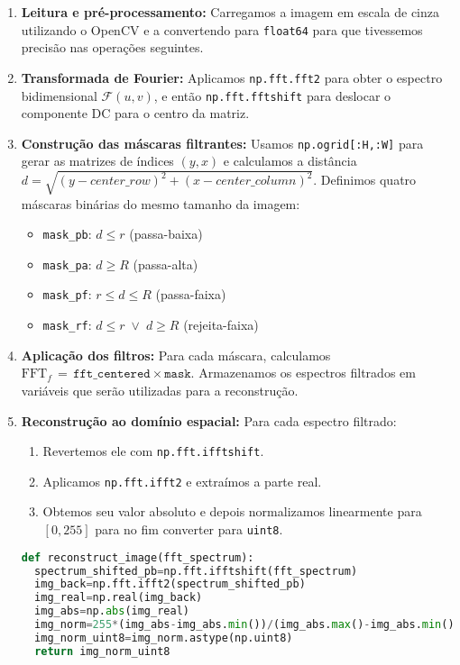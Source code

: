 \documentclass[12pt,a4paper]{article}
\begin{document}
\begin{enumerate}
  \item \textbf{Leitura e pré-processamento:}  
    Carregamos a imagem em escala de cinza utilizando o OpenCV e a convertendo para \texttt{float64} para que tivessemos precisão nas operações seguintes.

  \item \textbf{Transformada de Fourier:}  
    Aplicamos \texttt{np.fft.fft2} para obter o espectro bidimensional \(\mathcal{F}(u,v)\), e então \texttt{np.fft.fftshift} para deslocar o componente DC para o centro da matriz.

  \item \textbf{Construção das máscaras filtrantes:}  
    Usamos \texttt{np.ogrid[:H,:W]} para gerar as matrizes de índices \((y,x)\) e calculamos a distância\\ \(d=\sqrt{(y-center\_row)^2 + (x-center\_column)^2}\).  
    Definimos quatro máscaras binárias do mesmo tamanho da imagem:
    \begin{itemize}
      \item \texttt{mask\_pb}: \(d \le r\) (passa-baixa)  
      \item \texttt{mask\_pa}: \(d \ge R\) (passa-alta)  
      \item \texttt{mask\_pf}: \(r \le d \le R\) (passa-faixa)  
      \item \texttt{mask\_rf}: \(d \le r \;\lor\; d \ge R\) (rejeita-faixa)
    \end{itemize} 

  \item \textbf{Aplicação dos filtros:}  
    Para cada máscara, calculamos  
    \(\mathrm{FFT}_{f}\,=\,\texttt{fft\_centered} \times \texttt{mask}\).  
    Armazenamos os espectros filtrados em variáveis que serão utilizadas para a reconstrução.

  \item \textbf{Reconstrução ao domínio espacial:}  
    Para cada espectro filtrado:
    \begin{enumerate}
      \item Revertemos ele com \texttt{np.fft.ifftshift}.  
      \item Aplicamos \texttt{np.fft.ifft2} e extraímos a parte real.  
      \item Obtemos seu valor absoluto e depois normalizamos linearmente para \([0,255]\) para no fim converter para \texttt{uint8}.  
    \end{enumerate}
  
    \begin{lstlisting}[language=Python, caption={Função de reconstrução de imagem}]
def reconstruct_image(fft_spectrum):
  spectrum_shifted_pb=np.fft.ifftshift(fft_spectrum)
  img_back=np.fft.ifft2(spectrum_shifted_pb)
  img_real=np.real(img_back)
  img_abs=np.abs(img_real)
  img_norm=255*(img_abs-img_abs.min())/(img_abs.max()-img_abs.min())
  img_norm_uint8=img_norm.astype(np.uint8)
  return img_norm_uint8


\end{lstlisting}
\end{enumerate}
\end{document}
